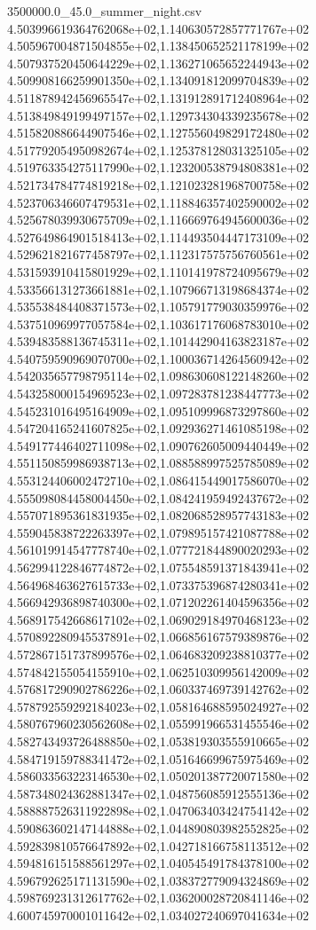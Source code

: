 \begin{filecontents*}{3500000.0_45.0_summer_night.csv}
4.503996619364762068e+02,1.140630572857771767e+02
4.505967004871504855e+02,1.138450652521178199e+02
4.507937520450644229e+02,1.136271065652244943e+02
4.509908166259901350e+02,1.134091812099704839e+02
4.511878942456965547e+02,1.131912891712408964e+02
4.513849849199497157e+02,1.129734304339235678e+02
4.515820886644907546e+02,1.127556049829172480e+02
4.517792054950982674e+02,1.125378128031325105e+02
4.519763354275117990e+02,1.123200538794808381e+02
4.521734784774819218e+02,1.121023281968700758e+02
4.523706346607479531e+02,1.118846357402590002e+02
4.525678039930675709e+02,1.116669764945600036e+02
4.527649864901518413e+02,1.114493504447173109e+02
4.529621821677458797e+02,1.112317575756760561e+02
4.531593910415801929e+02,1.110141978724095679e+02
4.533566131273661881e+02,1.107966713198684374e+02
4.535538484408371573e+02,1.105791779030359976e+02
4.537510969977057584e+02,1.103617176068783010e+02
4.539483588136745311e+02,1.101442904163823187e+02
4.540759590969070700e+02,1.100036714264560942e+02
4.542035657798795114e+02,1.098630608122148260e+02
4.543258000154969523e+02,1.097283781238447773e+02
4.545231016495164909e+02,1.095109996873297860e+02
4.547204165241607825e+02,1.092936271461085198e+02
4.549177446402711098e+02,1.090762605009440449e+02
4.551150859986938713e+02,1.088588997525785089e+02
4.553124406002472710e+02,1.086415449017586070e+02
4.555098084458004450e+02,1.084241959492437672e+02
4.557071895361831935e+02,1.082068528957743183e+02
4.559045838722263397e+02,1.079895157421087788e+02
4.561019914547778740e+02,1.077721844890020293e+02
4.562994122846774872e+02,1.075548591371843941e+02
4.564968463627615733e+02,1.073375396874280341e+02
4.566942936898740300e+02,1.071202261404596356e+02
4.568917542668617102e+02,1.069029184970468123e+02
4.570892280945537891e+02,1.066856167579389876e+02
4.572867151737899576e+02,1.064683209238810377e+02
4.574842155054155910e+02,1.062510309956142009e+02
4.576817290902786226e+02,1.060337469739142762e+02
4.578792559292184023e+02,1.058164688595024927e+02
4.580767960230562608e+02,1.055991966531455546e+02
4.582743493726488850e+02,1.053819303555910665e+02
4.584719159788341472e+02,1.051646699675975469e+02
4.586033563223146530e+02,1.050201387720071580e+02
4.587348024362881347e+02,1.048756085912555136e+02
4.588887526311922898e+02,1.047063403424754142e+02
4.590863602147144888e+02,1.044890803982552825e+02
4.592839810576647892e+02,1.042718166758113512e+02
4.594816151588561297e+02,1.040545491784378100e+02
4.596792625171131590e+02,1.038372779094324869e+02
4.598769231312617762e+02,1.036200028720841146e+02
4.600745970001011642e+02,1.034027240697041634e+02

\end{filecontents*}
